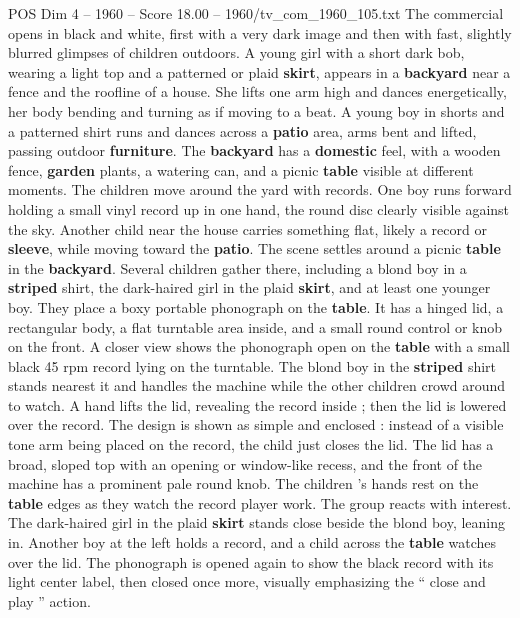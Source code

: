 \begin{textsample}{POS Dim 4 – 1960 – Score 18.00 – 1960/tv\_com\_1960\_105.txt}  \label{ex:f4_pos_061}
The commercial opens in black and white, first with a very dark image and then with fast, slightly blurred glimpses of children outdoors.
A young girl with a short dark bob, wearing a light top and a patterned or plaid \textbf{skirt}, appears in a \textbf{backyard} near a fence and the roofline of a house.
She lifts one arm high and dances energetically, her body bending and turning as if moving to a beat.
A young boy in shorts and a patterned shirt runs and dances across a \textbf{patio} area, arms bent and lifted, passing outdoor \textbf{furniture}.
The \textbf{backyard} has a \textbf{domestic} feel, with a wooden fence, \textbf{garden} plants, a watering can, and a picnic \textbf{table} visible at different moments.
The children move around the yard with records.
One boy runs forward holding a small vinyl record up in one hand, the round disc clearly visible against the sky.
Another child near the house carries something flat, likely a record or \textbf{sleeve}, while moving toward the \textbf{patio}.
The scene settles around a picnic \textbf{table} in the \textbf{backyard}.
Several children gather there, including a blond boy in a \textbf{striped} shirt, the dark-haired girl in the plaid \textbf{skirt}, and at least one younger boy.
They place a boxy portable phonograph on the \textbf{table}.
It has a hinged lid, a rectangular body, a flat turntable area inside, and a small round control or knob on the front.
A closer view shows the phonograph open on the \textbf{table} with a small black 45 rpm record lying on the turntable.
The blond boy in the \textbf{striped} shirt stands nearest it and handles the machine while the other children crowd around to watch.
A hand lifts the lid, revealing the record inside ; then the lid is lowered over the record.
The design is shown as simple and enclosed : instead of a visible tone arm being placed on the record, the child just closes the lid.
The lid has a broad, sloped top with an opening or window-like recess, and the front of the machine has a prominent pale round knob.
The children ’s hands rest on the \textbf{table} edges as they watch the record player work.
The group reacts with interest.
The dark-haired girl in the plaid \textbf{skirt} stands close beside the blond boy, leaning in.
Another boy at the left holds a record, and a child across the \textbf{table} watches over the lid.
The phonograph is opened again to show the black record with its light center label, then closed once more, visually emphasizing the “ close and play ” action.

\end{textsample}
